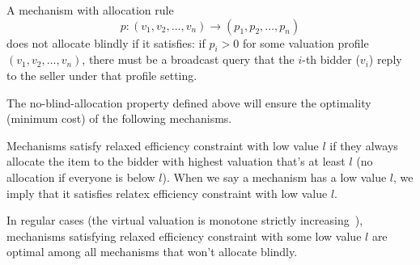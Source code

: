 \begin{definition}\label{def:allocation_cost}
A mechanism with allocation rule $$p: (v_1, v_2, \ldots, v_n) \rightarrow
(p_1, p_2, \ldots, p_n)$$ does not allocate blindly if it satisfies: if $p_i >
0$ for some valuation profile $(v_1, v_2, \ldots, v_n)$, there must be a
broadcast query that the $i$-th bidder ($v_i$) reply to the seller
under that profile setting.
\end{definition}

The no-blind-allocation property defined above will ensure the optimality
(minimum cost) of the following mechanisms.

\begin{definition}

Mechanisms satisfy relaxed efficiency constraint with low value $l$
if they always allocate the item to the bidder with highest valuation that's
at least $l$ (no allocation if everyone is below $l$).
%
%
%
%
%
When we say a mechanism has a low value $l$, we imply that it
satisfies relatex efficiency constraint with low value $l$.

\end{definition}


\begin{theorem}
In regular cases (the virtual valuation is monotone strictly increasing~\cite{}),
mechanisms satisfying relaxed efficiency constraint with some low value $l$ are
optimal among all mechanisms that won't allocate blindly.

\end{theorem}

